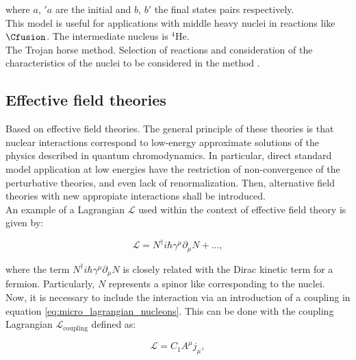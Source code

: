 \documentclass[openany]{book}
\begin{document}
where $a$, $'a$ are the initial and $b$, $b'$ the final states pairs respectively. \\

This model is useful for applications with middle heavy nuclei in reactions like $\Cfusion$. The intermediate nucleus is $\mathrm{{}^{4}He}$. \\

The Trojan horse method. Selection of reactions and consideration of the characteristics of the nuclei to be considered in the method \cite{spitaleri_mukhamedzhanov_blokhintsev_cognata_pizzone_tumino_2011}.

\subsection{Effective field theories} \label{sub:special_effectiveField}

Based on effective field theories. The general principle of these theories is that nuclear interactions correspond to low-energy approximate solutions of the physics described in quantum chromodynamics. In particular, direct standard model application at low energies have the restriction of non-convergence of the perturbative theories, and even lack of renormalization. Then, alternative field theories with new appropiate interactions shall be introduced. \\

An example of a Lagrangian $\mathcal{L}$ used within the context of effective field theory is given by: 

\begin{equation} \label{eq:micro_lagrangian_nucleons}
	\mathcal{L} = N^{\dagger}i\hbar\gamma^\mu\partial_\mu N + ... ,
\end{equation}

where the term $ N^{\dagger}i\hbar\gamma^\mu\partial_\mu N$ is closely related with the Dirac kinetic term for a fermion. Particularly, $N$ represents a spinor like corresponding to the nuclei. \\

Now, it is necessary to include the interaction via an introduction of a coupling in equation \ref{eq:micro_lagrangian_nucleons}. This can be done with the coupling Lagrangian  $	\mathcal{L}_{\mathrm{coupling}} $ defined as: 

 \begin{equation} \label{eq:micro_lagrangian_coupling}
 	\mathcal{L} =  C_1 A^\mu j_\mu ,
 \end{equation}
\end{document}
